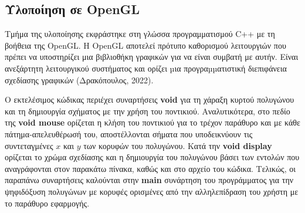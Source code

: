 \subsection{Υλοποίηση σε \textlatin{OpenGL}}

Tμήμα της υλοποίησης εκφράστηκε στη γλώσσα προγραμματισμού \textlatin{C++} με τη βοήθεια της \textlatin{OpenGL}. Η \textlatin{OpenGL} αποτελεί πρότυπο καθορισμού λειτουργιών που πρέπει να υποστηρίζει μια βιβλιοθήκη γραφικών για να είναι συμβατή με αυτήν. Είναι ανεξάρτητη λειτουργικού συστήματος και ορίζει µια προγραµµατιστική διεπιφάνεια σχεδίασης γραφικών (Δρακόπουλος, 2022). \par

Ο εκτελέσιμος κώδικας περιέχει συναρτήσεις \textbf{\textlatin{void}} για τη χάραξη κυρτού πολυγώνου και τη δημιουργία σχήματος με την χρήση του ποντικιού. Αναλυτικότερα, στο πεδίο της \textbf{\textlatin{void mouse}} ορίζεται η κλήση του ποντικιού για το τρέχον παράθυρο και με κάθε πάτημα-απελευθέρωσή του, αποστέλλονται σήματα που υποδεικνύουν τις συντεταγμένες $x$ και $y$ των κορυφών του πολυγώνου. Κατά την \textbf{\textlatin{void display}} ορίζεται το χρώμα σχεδίασης και η δημιουργία του πολυγώνου βάσει των εντολών που αναγράφονται στον παρακάτω πίνακα, καθώς και στο αρχείο του κώδικα. Τελικώς, οι παραπάνω συναρτήσεις καλούνται στην \textbf{\textlatin{main}} συνάρτηση του προγράμματος για την ψηφιδόξυση πολυγώνων με κορυφές ορισμένες από την αλληλεπίδραση του χρήστη με το παράθυρο εφαρμογής. \par

\vspace{2em}


